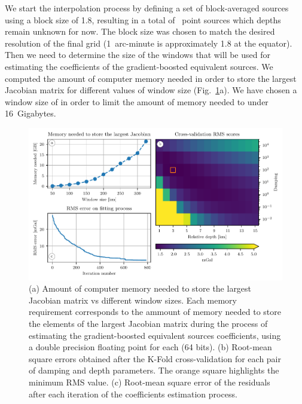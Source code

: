 We start the interpolation process by defining a set of block-averaged sources
using a block size of 1.8\km{}, resulting in a total of
\AustraliaEqlNSources{}~point sources which depths remain unknown for now.
The block size was chosen to match the desired resolution of the final grid
 (1~arc-minute is approximately 1.8\km{} at the equator).
Then we need to determine the size of the windows that will be used for
estimating the coefficients of the gradient-boosted equivalent sources.
We computed the amount of computer memory needed in order to store the largest
Jacobian matrix for different values of window size
(Fig.~\ref{fig:australia-memory-cv-error}a).
We have chosen a window size of \AustraliaEqlWindowSize{} in order to limit the
amount of memory needed to under 16~Gigabytes.

\begin{figure}
    \includegraphics[width=\linewidth]{figs/australia-memory-cv-error.pdf}
    \caption{
        (a) Amount of computer memory needed to store the largest Jacobian
        matrix vs different window sizes. Each memory requirement corresponds
        to the ammount of memory needed to store the elements of the largest
        Jacobian matrix during the process of estimating the gradient-boosted
        equivalent sources coefficients, using a double precision floating
        point for each (64 bits).
        (b) Root-mean square errors obtained after the K-Fold cross-validation
        for each pair of damping and depth parameters. The orange
        square highlights the minimum RMS value.
        (c) Root-mean square error of the residuals after each iteration of the
        coefficients estimation process.
    }
    \label{fig:australia-memory-cv-error}
\end{figure}

